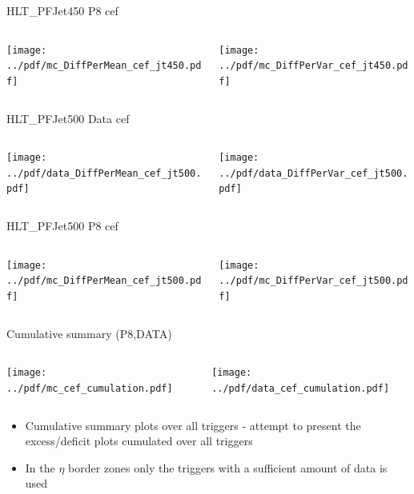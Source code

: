 \documentclass[9pt]{beamer}
\begin{document}
\begin{frame}[t]{HLT\_PFJet450 P8 cef}
\begin{columns}[T]
  \begin{column}{.5\textwidth}
  \texttt{[image: ../pdf/mc\_DiffPerMean\_cef\_jt450.pdf]}
  \end{column}
  \begin{column}{.5\textwidth}
  \texttt{[image: ../pdf/mc\_DiffPerVar\_cef\_jt450.pdf]}
  \end{column}
\end{columns}
\end{frame}

\begin{frame}[t]{HLT\_PFJet500 Data cef}
\begin{columns}[T]
  \begin{column}{.5\textwidth}
  \texttt{[image: ../pdf/data\_DiffPerMean\_cef\_jt500.pdf]}
  \end{column}
  \begin{column}{.5\textwidth}
  \texttt{[image: ../pdf/data\_DiffPerVar\_cef\_jt500.pdf]}
  \end{column}
\end{columns}
\end{frame}

\begin{frame}[t]{HLT\_PFJet500 P8 cef}
\begin{columns}[T]
  \begin{column}{.5\textwidth}
  \texttt{[image: ../pdf/mc\_DiffPerMean\_cef\_jt500.pdf]}
  \end{column}
  \begin{column}{.5\textwidth}
  \texttt{[image: ../pdf/mc\_DiffPerVar\_cef\_jt500.pdf]}
  \end{column}
\end{columns}
\end{frame}

\begin{frame}[t]{Cumulative summary (P8,DATA)}
\begin{columns}[T]
  \begin{column}{.5\textwidth}
  \texttt{[image: ../pdf/mc\_cef\_cumulation.pdf]}
  \end{column}
  \begin{column}{.5\textwidth}
  \texttt{[image: ../pdf/data\_cef\_cumulation.pdf]}
  \end{column}
\end{columns}
\begin{itemize}
 \item Cumulative summary plots over all triggers - attempt to present the excess/deficit plots cumulated over all triggers
 \item In the $\eta$ border zones only the triggers with a sufficient amount of data is used
\end{itemize}
\end{frame}
\end{document}
